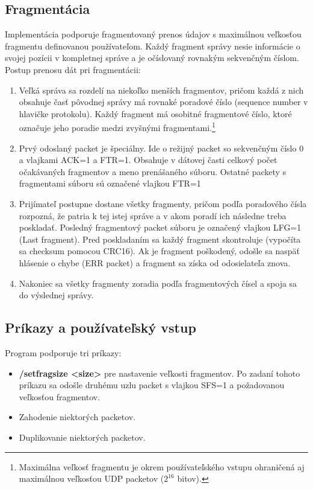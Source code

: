 \documentclass[a4paper,12pt]{article}
\begin{document}
    \subsection{Fragmentácia}\label{frag}
    Implementácia podporuje fragmentovaný prenos údajov s maximálnou veľkosťou fragmentu definovanou používateľom. Každý fragment správy nesie informácie o svojej pozícii v kompletnej správe a je očíslovaný rovnakým sekvenčným číslom. Postup prenosu dát pri fragmentácii:

	\begin{enumerate}
		\item Veľká správa sa rozdelí na niekoľko menších fragmentov, pričom každá z nich obsahuje časť pôvodnej správy má rovnaké poradové číslo (sequence number v hlavičke protokolu). Každý fragment má osobitné fragmentové číslo, ktoré označuje jeho poradie medzi zvyšnými fragmentami.\footnote{Maximálna veľkosť fragmentu je okrem používateľského vstupu ohraničená aj maximálnou veľkosťou UDP packetov (${2}^{16}$ bitov).}
		\item Prvý odoslaný packet je špeciálny. Ide o režijný packet so sekvenčným číslo 0 a vlajkami ACK=1 a FTR=1. Obsahuje v dátovej časti celkový počet očakávaných fragmentov a meno prenášaného súboru. Ostatné packety s fragmentami súboru sú označené vlajkou FTR=1
		\item Prijímateľ postupne dostane všetky fragmenty, pričom podľa poradového čísla rozpozná, že patria k tej istej správe a v akom poradí ich následne treba poskladať. Posledný fragmentový packet súboru je označený vlajkou LFG=1 (Last fragment). Pred poskladaním sa každý fragment skontroluje (vypočíta sa checksum pomocou CRC16). Ak je fragment poškodený, odošle sa naspäť hlásenie o chybe (ERR packet) a fragment sa získa od odosielateľa znova.
		\item Nakoniec sa všetky fragmenty zoradia podľa fragmentových čísel a spoja sa do výslednej správy.
	\end{enumerate}
    
     \subsection{Príkazy a používateľský vstup}
	Program podporuje tri príkazy:
	\begin{itemize}
		\item \textbf{/setfragsize <size>} pre nastavenie veľkosti fragmentov. Po zadaní tohoto príkazu sa odošle druhému uzlu packet s vlajkou SFS=1 a požadovanou veľkosťou fragmentov.
		\item Zahodenie niektorých packetov.
		\item Duplikovanie niektorých packetov. 
	\end{itemize}
  
\end{document}
